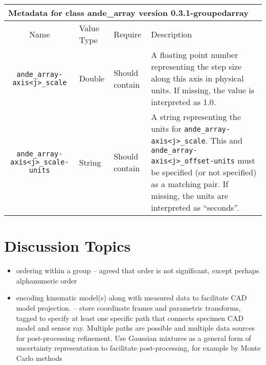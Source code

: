 \documentclass{article}
\newenvironment{AndeMetadata}[3]{
  
  \begin{tabular}{|c p{.4in} p{.5in} p{2.9in}|}
    \multicolumn{4}{l}{{\Large \bf Metadata for class #3}{\Large \ttfamily \fontseries{b} #1} version #2 }\\
    \hline
    Name & Value Type & Require & Description \\
    \hline
}{
  \hline
  \end{tabular}
}
\newcommand{\AndeMetadataLine}[4]{{\tt #1} & #2 & #3 & #4 \\}
\begin{document}
\begin{AndeMetadata}{ande\_array}{0.3.1-groupedarray}{}
{  }
  \AndeMetadataLine{ande\_array-axis<j>\_scale}{Double}{Should contain}{
    A floating point number representing the step size along this axis in physical units. If missing, the value is interpreted as 1.0.
  }
  \AndeMetadataLine{ande\_array-axis<j>\_scale-units}{String}{Should contain}{
    A string representing the units for {\tt ande\_array-axis<j>\_scale}. This and {\tt ande\_array-axis<j>\_offset-units} must be specified (or not specified) as a matching pair. If missing, the units are interpreted as ``seconds''.
  }
\end{AndeMetadata}

\section{Discussion Topics}
\begin{itemize}

\item ordering within a group -- agreed that order is not significant, except perhaps alphanumeric order
\item encoding kinematic model(s) along with measured data to facilitate CAD model projection. -- store coordinate frames and parametric transforms, tagged to specify at least one specific path that connects specimen CAD model and sensor ray. Multiple paths are possible and multiple data sources for post-processing refinement. Use Gaussian mixtures as a general form of uncertainty representation to facilitate post-processing, for example by Monte Carlo methods
\end{itemize}
\end{document}
